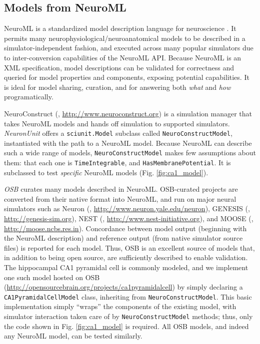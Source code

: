 \documentclass{frontiersSCNS}
\let\verbx\lstinline
\begin{document}
\subsection{Models from NeuroML}\label{sec:neuroml_models}
NeuroML is a standardized model description language for neuroscience \citep{gleeson_neuroml:_2010}. 
It permits many neurophysiological/neuroanatomical models to be described in a simulator-independent fashion, and executed across many popular simulators due to inter-conversion capabilities of the NeuroML API. 
Because NeuroML is an XML specification, model descriptions can be validated for correctness and queried for model properties and components, exposing potential capabilities. 
It is ideal for model sharing, curation, and for answering both \textit{what} and \textit{how} programatically.  

NeuroConstruct (\cite{gleeson_neuroconstruct:_2007}, \url{http://www.neuroconstruct.org}) is a simulation manager that takes NeuroML models and hands off simulation to supported simulators. 
\textit{NeuronUnit} offers a \verbx{sciunit.Model} subclass called \verbx{NeuroConstructModel}, instantiated with the path to a NeuroML model.  
Because NeuroML can describe such a wide range of models, \verbx{NeuroConstructModel} makes few assumptions about them: that each one is \verbx{TimeIntegrable}, and \verbx{HasMembranePotential}.  
It is subclassed to test \textit{specific} NeuroML models (Fig. \ref{fig:ca1_model}). 

\textit{OSB} curates many models described in NeuroML. 
OSB-curated projects are converted from their native format into NeuroML, and run on major neural simulators such as Neuron (\cite{carnevale_neuron_2006}, \url{http://www.neuron.yale.edu/neuron}), GENESIS (\cite{bower_genesis_2007}, \url{http://genesis-sim.org}), NEST (\cite{gewaltig_nest_2007}, \url{http://www.nest-initiative.org}), and MOOSE (\cite{ray_moose_2008}, \url{http://moose.ncbs.res.in}). 
Concordance between model output (beginning with the NeuroML description) and reference output (from native simulator source files) is reported for each model. 
Thus, OSB is an excellent source of models that, in addition to being open source, are sufficiently described to enable validation. 
The hippocampal CA1 pyramidal cell is commonly modeled, and we implement one such model hosted on OSB (\url{http://opensourcebrain.org/projects/ca1pyramidalcell}) by simply declaring a \verbx{CA1PyramidalCellModel} class, inheriting from \verbx{NeuroConstructModel}.  
This basic implementation simply ``wraps'' the components of the existing model, with simulator interaction taken care of by \verbx{NeuroConstructModel} methods; 
thus, only the code shown in Fig. \ref{fig:ca1_model} is required. 
All OSB models, and indeed any NeuroML model, can be tested similarly. 
\end{document}
